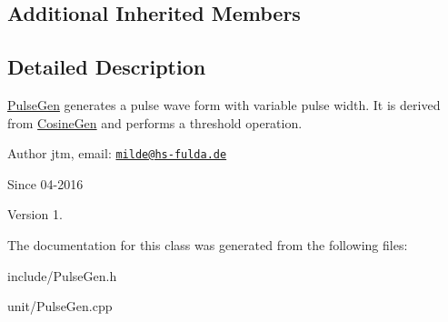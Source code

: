 \subsection*{Additional Inherited Members}


\subsection{Detailed Description}
\hyperlink{classunit_1_1PulseGen}{Pulse\+Gen} generates a pulse wave form with variable pulse width. It is derived from \hyperlink{classunit_1_1CosineGen}{Cosine\+Gen} and performs a threshold operation.

\begin{DoxyAuthor}{Author}
jtm, email\+:  \href{mailto:milde@hs-fulda.de}{\tt milde@hs-\/fulda.\+de} 
\end{DoxyAuthor}
\begin{DoxySince}{Since}
04-\/2016 
\end{DoxySince}
\begin{DoxyVersion}{Version}
1. 
\end{DoxyVersion}


The documentation for this class was generated from the following files\+:\begin{DoxyCompactItemize}
\item 
include/Pulse\+Gen.\+h\item 
unit/Pulse\+Gen.\+cpp\end{DoxyCompactItemize}
